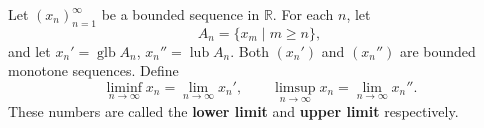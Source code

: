 Let $(x_n)_{n=1}^{\infty}$ be a bounded sequence in $\mathbb{R}$. For each $n$, let
$$A_n = \{x_m \mid m \geq n\},$$
and let $x_n' = \operatorname{glb} A_n$, $x_n'' = \operatorname{lub} A_n$. Both $(x_n')$ and $(x_n'')$ are bounded monotone sequences. Define
$$\liminf_{n \to \infty} x_n = \lim_{n \to \infty} x_n', \qquad \limsup_{n \to \infty} x_n = \lim_{n \to \infty} x_n''.$$
These numbers are called the \textbf{lower limit} and \textbf{upper limit} respectively.

